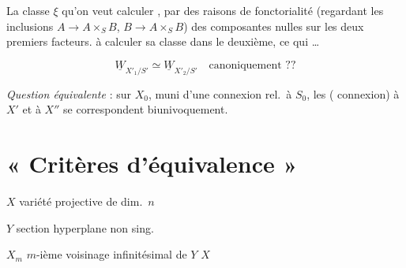 \documentclass[11pt,a4paper]{article}
\begin{document}
La classe $\xi$ qu'on veut calculer , par des raisons de fonctorialité (regardant les inclusions $A \to A \times_S B$, $B \to A \times_S B$) des composantes nulles sur les deux premiers facteurs.   à calculer sa classe dans le deuxième, ce qui   …


\[
  \underline{W}_{X'_1/S'} \simeq \underline{W}_{X'_2/S'} \quad \text{canoniquement ??}
\]

\emph{Question équivalente} :   \ill{}  sur $X_0$, muni d'une connexion rel.\ à $S_0$,  les  ( connexion) à $X'$ et à $X''$ se correspondent biunivoquement.

\section{« Critères d'équivalence »}

$X$ variété projective \struck{\ill{}} \struck{\ill{}}  de dim.\ $n$

$Y$ section hyperplane \struck{\ill{}} non sing.

$X_m$ $m$-ième voisinage infinitésimal de $Y$  $X$
\end{document}
